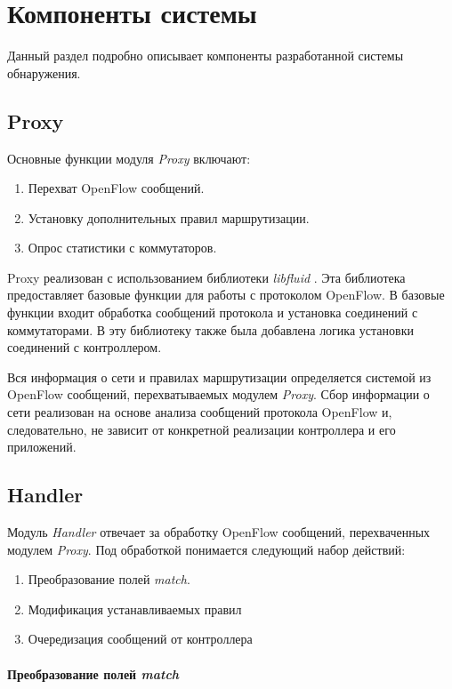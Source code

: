 \documentclass[../thesis.tex]{subfiles}
\begin{document}
\chapter{Компоненты системы} \label{chapter:appendix}

Данный раздел подробно описывает компоненты разработанной системы обнаружения.

\section{Proxy}

Основные функции модуля \textit{Proxy} включают:
\begin{enumerate}
\item Перехват OpenFlow сообщений.
\item Установку дополнительных правил маршрутизации.
\item Опрос статистики с коммутаторов.
\end{enumerate}

Proxy реализован с использованием библиотеки \textit{libfluid} \cite{vidal2014libfluid}.
Эта библиотека предоставляет базовые функции для работы с протоколом OpenFlow.
В базовые функции входит обработка сообщений протокола и установка соединений с коммутаторами.
В эту библиотеку также была добавлена логика установки соединений с контроллером.

Вся информация о сети и правилах маршрутизации определяется системой из OpenFlow сообщений, перехватываемых модулем \textit{Proxy}. 
Сбор информации о сети реализован на основе анализа сообщений протокола OpenFlow и, следовательно, не зависит от конкретной реализации контроллера и его приложений.

\section{Handler}

Модуль \textit{Handler} отвечает за обработку OpenFlow сообщений, перехваченных модулем \textit{Proxy}.
Под обработкой понимается следующий набор действий:
\begin{enumerate}
\item Преобразование полей \textit{match}.
\item Модификация устанавливаемых правил
\item Очередизация сообщений от контроллера
\end{enumerate}

\subsubsection{Преобразование полей \textit{match}}
\end{document}

